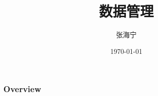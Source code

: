 \documentclass{beamer}
\title[数据管理]{数据管理} %
\author{张海宁} %
\institute[计算机科学与技术学院] %
{
贵州大学 \\ %
\medskip
\textit{hnzhang1@gzu.edu.cn} %
}
\date{\today} %
\begin{document}
\begin{frame}
\titlepage %
\end{frame}

\begin{frame}
\frametitle{Overview} %
\tableofcontents %
\end{frame}

\end{document}
